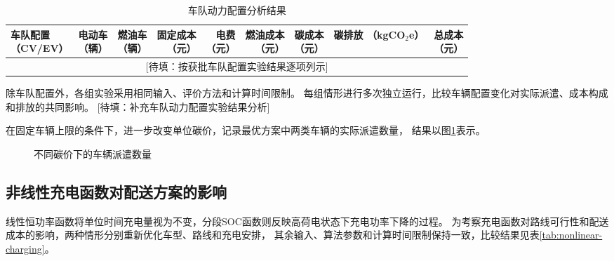\documentclass{setp-new}
\DeclareRobustCommand{\TBD}[1]{%
  \textcolor{black!65}{[待填：#1]}}
\begin{document}
\begin{table}[H]
  \centering
  \caption{车队动力配置分析结果}
  \label{tab:fleet-levels}
  \small
  \setlength{\tabcolsep}{1.1pt}
  \begin{tabular*}{\textwidth}{@{\extracolsep{\fill}}lrrrrrrrr@{}}
    \toprule
    \makecell{车队配置\\（CV/EV）} & \makecell{电动车\\（辆）} & \makecell{燃油车\\（辆）} & \makecell{固定成本\\（元）} & \makecell{电费\\（元）} & \makecell{燃油成本\\（元）} & \makecell{碳成本\\（元）} & \makecell{碳排放\\（kgCO$_2$e）} & \makecell{总成本\\（元）}\\
    \midrule
    \multicolumn{9}{c}{\TBD{按获批车队配置实验结果逐项列示}}\\
    \bottomrule
  \end{tabular*}
\end{table}

除车队配置外，各组实验采用相同输入、评价方法和计算时间限制。
每组情形进行多次独立运行，比较车辆配置变化对实际派遣、成本构成和排放的共同影响。
\TBD{补充车队动力配置实验结果分析}

在固定车辆上限的条件下，进一步改变单位碳价，记录最优方案中两类车辆的实际派遣数量，
结果以图\ref{fig:fleet-carbon-price}表示。

\begin{figure}[H]
  \centering
  \fbox{\parbox[c][3.8cm][c]{0.86\textwidth}{\centering
  \fontsize{8pt}{9.6pt}\selectfont\TBD{横轴为单位碳价，纵轴分别绘制燃油车和电动车派遣数量}}}
  \caption{不同碳价下的车辆派遣数量}
  \label{fig:fleet-carbon-price}
\end{figure}

\subsection{非线性充电函数对配送方案的影响}

线性恒功率函数将单位时间充电量视为不变，分段SOC函数则反映高荷电状态下充电功率下降的过程。
为考察充电函数对路线可行性和配送成本的影响，两种情形分别重新优化车型、路线和充电安排，
其余输入、算法参数和计算时间限制保持一致，比较结果见表\ref{tab:nonlinear-charging}。
\end{document}
